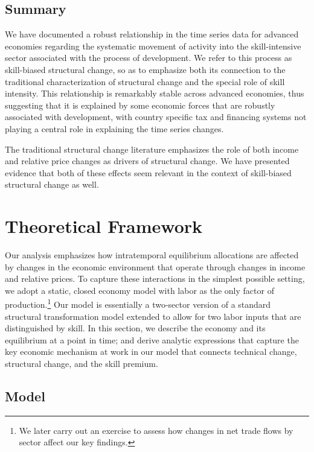 \documentclass[12pt,english]{article}
\begin{document}
\subsection{Summary}

We have documented a robust relationship in the time series data for
advanced economies regarding the systematic movement of activity into the
skill-intensive sector associated with the process of development. We refer
to this process as skill-biased structural change, so as to emphasize both
its connection to the traditional characterization of structural change and
the special role of skill intensity. This relationship is remarkably stable
across advanced economies, thus suggesting that it is explained by some
economic forces that are robustly associated with development, with country
specific tax and financing systems not playing a central role in explaining
the time series changes.

The traditional structural change literature emphasizes the role of both
income and relative price changes as drivers of structural change. We have
presented evidence that both of these effects seem relevant in the context
of skill-biased structural change as well.

\section{Theoretical Framework}

Our analysis emphasizes how intratemporal equilibrium allocations are
affected by changes in the economic environment that operate through changes
in income and relative prices. To capture these interactions in the simplest
possible setting, we adopt a static, closed economy model with labor as the
only factor of production.\footnote{%
We later carry out an exercise to assess how changes in net trade flows by
sector affect our key findings.} Our model is essentially a two-sector
version of a standard structural transformation model extended to allow for
two labor inputs that are distinguished by skill. In this section, we
describe the economy and its equilibrium at a point in time; and derive
analytic expressions that capture the key economic mechanism at work in our
model that connects technical change, structural change, and the skill
premium.

\subsection{Model}
\end{document}
